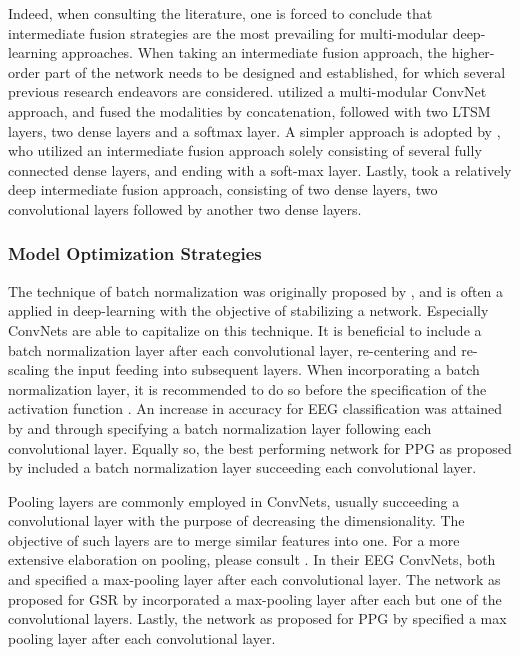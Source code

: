 \documentclass[12pt]{article}
\begin{document}
Indeed, when consulting the literature, one is forced to conclude that intermediate fusion strategies are the most prevailing for multi-modular deep-learning approaches. When taking an intermediate fusion approach, the higher-order part of the network needs to be designed and established, for which several previous research endeavors are considered.   utilized a multi-modular ConvNet approach, and fused the modalities by concatenation, followed with two LTSM layers, two dense layers and a softmax layer. A simpler approach is adopted by , who utilized an intermediate fusion approach solely consisting of several fully connected dense layers, and ending with a soft-max layer. Lastly,  took a relatively deep intermediate fusion approach, consisting of two dense layers, two convolutional layers followed by another two dense layers.  

\subsubsection{Model Optimization Strategies}
The technique of batch normalization was originally proposed by , and is often a applied in deep-learning with the objective of stabilizing a network. Especially ConvNets are able to capitalize on this technique. It is beneficial to include a batch normalization layer after each convolutional layer, re-centering and re-scaling the input feeding into subsequent layers. When incorporating a batch normalization layer, it is recommended to do so before the specification of the activation function \cite{ioffe2015batch}. An increase in accuracy for EEG classification was attained by  and  through specifying a batch normalization layer following each convolutional layer. Equally so, the best performing network for PPG as proposed by  included a batch normalization layer succeeding each convolutional layer. 

Pooling layers are commonly employed in ConvNets, usually succeeding a convolutional layer with the purpose of decreasing the dimensionality. The objective of such layers are to merge similar features into one. For a more extensive elaboration on pooling, please consult . In their EEG ConvNets, both  and  specified a max-pooling layer after each convolutional layer. The network as proposed for GSR by  incorporated a max-pooling layer after each but one of the convolutional layers. Lastly, the network as proposed for PPG by \cite{biswas2019cornet} specified a max pooling layer after each convolutional layer. 
\end{document}
